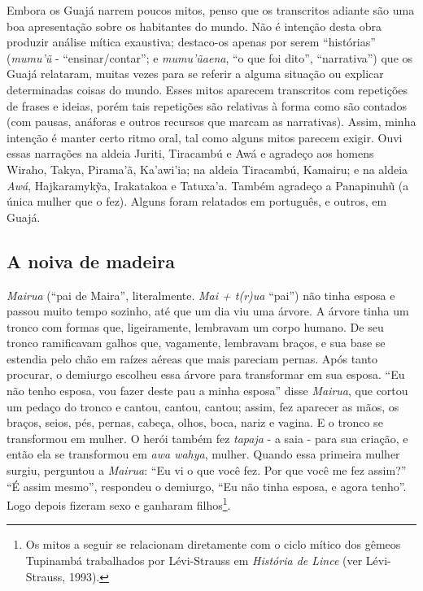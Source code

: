Embora os Guajá narrem poucos mitos, penso que os transcritos adiante
são uma boa apresentação sobre os habitantes do mundo. Não é intenção
desta obra produzir análise mítica exaustiva; destaco-os apenas por
serem ``histórias'' (\emph{mumu'ũ} - ``ensinar/contar''; e
\emph{mumu'ũaena}, ``o que foi dito'', ``narrativa'') que os Guajá
relataram, muitas vezes para se referir a alguma situação ou explicar
determinadas coisas do mundo. Esses mitos aparecem transcritos com
repetições de frases e ideias, porém tais repetições são relativas à
forma como são contados (com pausas, anáforas e outros recursos que
marcam as narrativas). Assim, minha intenção é manter certo ritmo oral,
tal como alguns mitos parecem exigir. Ouvi essas narrações na aldeia
Juriti, Tiracambú e Awá e agradeço aos homens Wiraho, Takya, Pirama'ã,
Ka'awi'ia; na aldeia Tiracambú, Kamairu; e na aldeia \emph{Awá},
Hajkaramykỹa, Irakatakoa e Tatuxa'a. Também agradeço a Panapinuhũ (a
única mulher que o fez). Alguns foram relatados em português, e outros,
em Guajá.

\subsection{A noiva de madeira}

\emph{Mairua} (``pai de Maira'', literalmente. \emph{Mai + t(r)ua} ``pai'')
não tinha esposa e passou muito tempo sozinho, até que um dia viu uma
árvore. A árvore tinha um tronco com formas que, ligeiramente, lembravam
um corpo humano. De seu tronco ramificavam galhos que, vagamente,
lembravam braços, e sua base se estendia pelo chão em raízes aéreas que
mais pareciam pernas. Após tanto procurar, o demiurgo escolheu essa
árvore para transformar em sua esposa. ``Eu não tenho esposa, vou fazer
deste pau a minha esposa'' disse \emph{Mairua}, que cortou um pedaço do
tronco e cantou, cantou, cantou; assim, fez aparecer as mãos, os braços,
seios, pés, pernas, cabeça, olhos, boca, nariz e vagina. E o tronco se
transformou em mulher. O herói também fez \emph{tapaja} - a saia - para
sua criação, e então ela se transformou em \emph{awa wahya}, mulher.
Quando essa primeira mulher surgiu, perguntou a \emph{Mairua}: ``Eu vi o
que você fez. Por que você me fez assim?'' ``É assim mesmo'', respondeu o
demiurgo, ``Eu não tinha esposa, e agora tenho''. Logo depois fizeram sexo
e ganharam filhos\footnote{Os mitos a seguir se relacionam diretamente
  com o ciclo mítico dos gêmeos Tupinambá trabalhados por Lévi-Strauss
  em \emph{História de Lince} (ver Lévi-Strauss, 1993).}.

